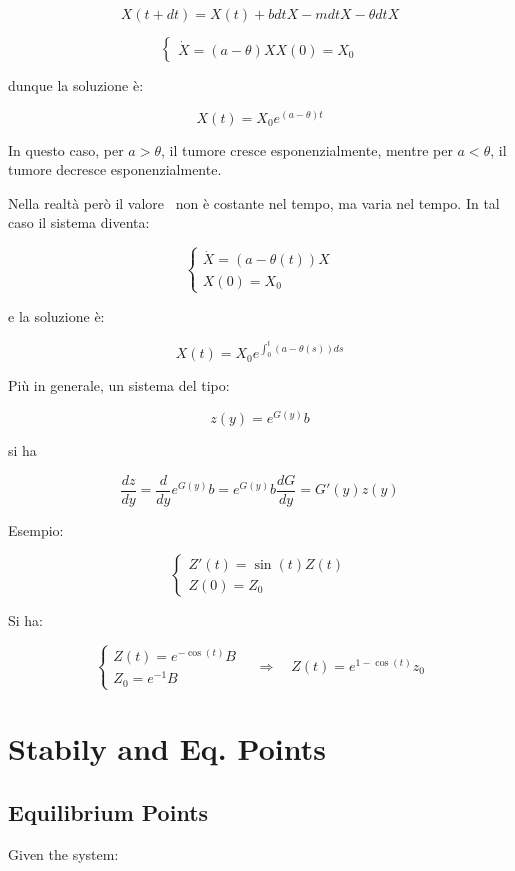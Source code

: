 $$
X(t + dt) = X(t) + b dt X - mdt X - \theta dt X
$$

$$
\begin{cases}
\dot X = (a - \theta) X
X(0) = X_0
\end{cases}
$$

dunque la soluzione è:

$$
X(t) = X_0 e^{(a - \theta)t}
$$

In questo caso, per $a > \theta$, il tumore cresce esponenzialmente, mentre per $a < \theta$, il tumore decresce esponenzialmente.

Nella realtà però il valore \theta \ non è costante nel tempo, ma varia nel tempo. In tal caso il sistema diventa:

$$
\begin{cases}
\dot X = (a - \theta(t)) X \\
X(0) = X_0
\end{cases}
$$

e la soluzione è:

$$
X(t) = X_0 e^{\int_0^t (a - \theta(s)) ds}
$$


Più in generale, un sistema del tipo:

$$
z(y) = e^{G(y)} b
$$

si ha

$$
\frac{dz}{dy} = \frac{d}{dy} e^{G(y)} b = e^{G(y)} b \frac{dG}{dy} = G'(y)z(y)
$$

Esempio:

$$
\begin{cases}
    Z'(t) = \sin(t) Z(t) \\
    Z(0) = Z_0
\end{cases}
$$

Si ha:

$$
\begin{cases}
Z(t) = e^{-\cos(t)} B \\
Z_0 = e^{-1} B
\end{cases}
\quad \Rightarrow \quad
Z(t) = e^{1-\cos(t)} z_0
$$

\newpage

\section{Stabily and Eq. Points}

\subsection{Equilibrium Points}

Given the system:

